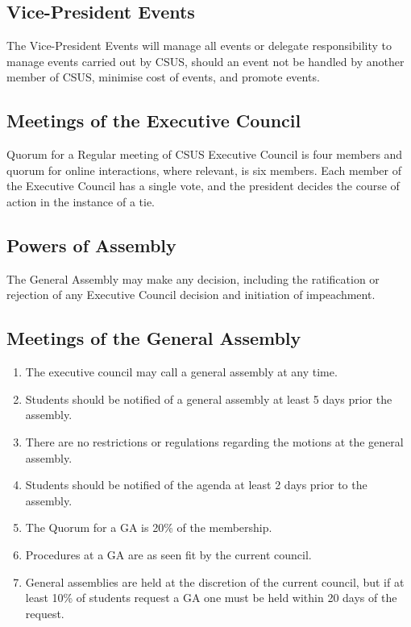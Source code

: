 \subsection{Vice-President Events}\label{vice-president-events}

The Vice-President Events will manage all events or delegate
responsibility to manage events carried out by CSUS, should an event not
be handled by another member of CSUS, minimise cost of events, and
promote events.

\subsection{Meetings of the Executive
Council}\label{meetings-of-the-executive-council}

Quorum for a Regular meeting of CSUS Executive Council is four members
and quorum for online interactions, where relevant, is six members. Each
member of the Executive Council has a single vote, and the president
decides the course of action in the instance of a tie.

\subsection{Powers of Assembly}\label{powers-of-assembly}

The General Assembly may make any decision, including the ratification
or rejection of any Executive Council decision and initiation of
impeachment.

\subsection{Meetings of the General
Assembly}\label{meetings-of-the-general-assembly}

\begin{enumerate}
\def\labelenumi{\arabic{enumi}.}
\item
  The executive council may call a general assembly at any time.
\item
  Students should be notified of a general assembly at least 5 days
  prior the assembly.
\item
  There are no restrictions or regulations regarding the motions at the
  general assembly.
\item
  Students should be notified of the agenda at least 2 days prior to the
  assembly.
\item
  The Quorum for a GA is 20\% of the membership.
\item
  Procedures at a GA are as seen fit by the current council.
\item
  General assemblies are held at the discretion of the current council,
  but if at least 10\% of students request a GA one must be held within
  20 days of the request.
\end{enumerate}

